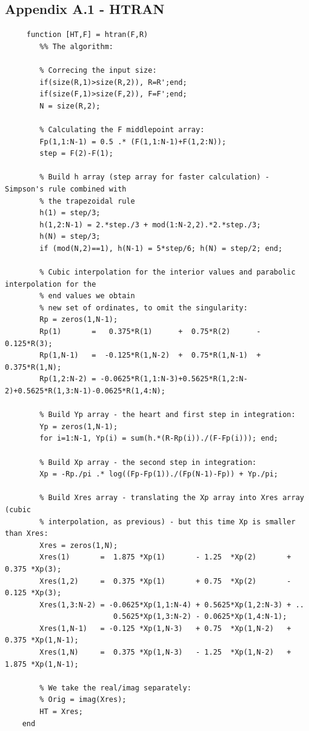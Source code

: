 \documentclass[12pt,twoside,a4paper]{article}
\numberwithin{equation}{subsection}
\numberwithin{figure}{subsection}
\begin{document}
\subsection*{Appendix A.1 - HTRAN}
\begin{lstlisting}
	 function [HT,F] = htran(F,R)
	    %% The algorithm:
	   
	    % Correcing the input size:
	    if(size(R,1)>size(R,2)), R=R';end;
	    if(size(F,1)>size(F,2)), F=F';end;
	    N = size(R,2);
	    
	    % Calculating the F middlepoint array:
	    Fp(1,1:N-1) = 0.5 .* (F(1,1:N-1)+F(1,2:N));
	    step = F(2)-F(1);
	    
	    % Build h array (step array for faster calculation) - Simpson's rule combined with 
	    % the trapezoidal rule
	    h(1) = step/3;
	    h(1,2:N-1) = 2.*step./3 + mod(1:N-2,2).*2.*step./3;
	    h(N) = step/3;
	    if (mod(N,2)==1), h(N-1) = 5*step/6; h(N) = step/2; end;
	    
	    % Cubic interpolation for the interior values and parabolic interpolation for the 
	    % end values we obtain
	    % new set of ordinates, to omit the singularity:
	    Rp = zeros(1,N-1);
	    Rp(1)       =   0.375*R(1)      +  0.75*R(2)      - 0.125*R(3);
	    Rp(1,N-1)   =  -0.125*R(1,N-2)  +  0.75*R(1,N-1)  + 0.375*R(1,N);
	    Rp(1,2:N-2) = -0.0625*R(1,1:N-3)+0.5625*R(1,2:N-2)+0.5625*R(1,3:N-1)-0.0625*R(1,4:N);
	    
	    % Build Yp array - the heart and first step in integration:
	    Yp = zeros(1,N-1);
	    for i=1:N-1, Yp(i) = sum(h.*(R-Rp(i))./(F-Fp(i))); end;
	    
	    % Build Xp array - the second step in integration:
	    Xp = -Rp./pi .* log((Fp-Fp(1))./(Fp(N-1)-Fp)) + Yp./pi;
	    
	    % Build Xres array - translating the Xp array into Xres array (cubic
	    % interpolation, as previous) - but this time Xp is smaller than Xres:
	    Xres = zeros(1,N);
	    Xres(1)       =  1.875 *Xp(1)       - 1.25  *Xp(2)       + 0.375 *Xp(3);
	    Xres(1,2)     =  0.375 *Xp(1)       + 0.75  *Xp(2)       - 0.125 *Xp(3);
	    Xres(1,3:N-2) = -0.0625*Xp(1,1:N-4) + 0.5625*Xp(1,2:N-3) + ..
	                     0.5625*Xp(1,3:N-2) - 0.0625*Xp(1,4:N-1);
	    Xres(1,N-1)   = -0.125 *Xp(1,N-3)   + 0.75  *Xp(1,N-2)   + 0.375 *Xp(1,N-1);
	    Xres(1,N)     =  0.375 *Xp(1,N-3)   - 1.25  *Xp(1,N-2)   + 1.875 *Xp(1,N-1);
	    
	    % We take the real/imag separately:
	    % Orig = imag(Xres);
	    HT = Xres;
	end
	
	 
\end{lstlisting}
\end{document}
